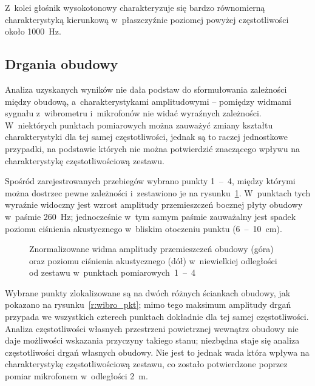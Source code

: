 \documentclass[12pt]{oska}
\newcommand{\range}[2]{\num{#1}~--~\num{#2}}
\begin{document}
		Z~kolei głośnik wysokotonowy charakteryzuje się bardzo równomierną charakterystyką kierunkową w~płaszczyźnie poziomej powyżej częstotliwości około \SI{1000}{Hz}.


	
	\subsection{Drgania obudowy}
		
		Analiza uzyskanych wyników nie dała podstaw do sformułowania zależności między obudową, a~charakterystykami amplitudowymi -- pomiędzy widmami sygnału z~wibrometru i~mikrofonów nie widać wyraźnych zależności. W~niektórych punktach pomiarowych można zauważyć zmiany kształtu charakterystyki dla tej samej częstotliwości, jednak są to raczej jednostkowe przypadki, na podstawie których nie można potwierdzić znaczącego wpływu na charakterystykę częstotliwościową zestawu.
		
		Spośród zarejestrowanych przebiegów wybrano punkty \range{1}{4}, między którymi można dostrzec pewne zależności i~zestawiono je na rysunku~\ref{r:wibrometr_1-4}. W~punktach tych wyraźnie widoczny jest wzrost amplitudy przemieszczeń bocznej płyty obudowy w~paśmie \SI{260}{\hertz}; jednocześnie w~tym samym paśmie zauważalny jest spadek poziomu ciśnienia akustycznego w~bliskim otoczeniu punktu (\range{6}{10}~\si{\cm}).
		
		\begin{figure}[!ht]
			\centering
			\caption{Znormalizowane widma amplitudy przemieszczeń obudowy (góra) oraz poziomu ciśnienia akustycznego (dół) w~niewielkiej odległości od zestawu w~punktach pomiarowych~\range{1}{4}}
			\label{r:wibrometr_1-4}
		\end{figure}
		
		Wybrane punkty zlokalizowane są na dwóch różnych ściankach obudowy, jak pokazano na rysunku~\ref{r:wibro_pkt}; mimo tego maksimum amplitudy drgań przypada we wszystkich czterech punktach dokładnie dla tej samej częstotliwości. Analiza częstotliwości własnych przestrzeni powietrznej wewnątrz obudowy nie daje możliwości wskazania przyczyny takiego stanu; niezbędna staje się analiza częstotliwości drgań własnych obudowy. Nie jest to jednak wada która wpływa na charakterystykę częstotliwościową zestawu, co zostało potwierdzone poprzez pomiar mikrofonem w~odległości \SI{2}{\metre}.
		
\end{document}
